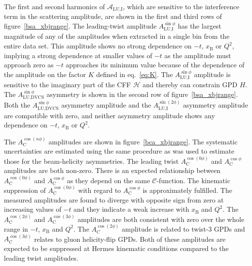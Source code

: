 \documentclass[11pt,a4paper]{article}
\begin{document}
The first and second harmonics of $\mathcal{A}_{\textrm{LU,I}}$, which are sensitive to the interference term in the scattering amplitude, are shown in the first and third rows of figure~\ref{bsa_xbjrange}. The leading-twist amplitude $A_{\textrm{LU,I}}^{\sin\phi}$ has the largest magnitude of any of the amplitudes when extracted in a single bin from the entire data set. This amplitude shows no strong dependence on $-t$, $x_{\textrm{B}}$ or $Q^{2}$, implying a strong dependence at smaller values of $-t$ as the amplitude must approach zero as $-t$ approaches its minimum value because of the dependence of the amplitude on the factor $K$ defined in eq.~\ref{eq:K}. The $A_{\textrm{LU,I}}^{\sin\phi}$ amplitude is sensitive to the imaginary part of the CFF $\mathcal{H}$ and thereby can constrain GPD $\textit{H}$. The $A_{\textrm{LU,DVCS}}^{\sin\phi}$ asymmetry is shown in the second row of figure~\ref{bsa_xbjrange}. Both the $A_{\textrm{LU,DVCS}}^{\sin\phi}$ asymmetry amplitude and the $A_{\textrm{LU,I}}^{\sin(2\phi)}$ asymmetry amplitude are compatible with zero, and neither asymmetry amplitude shows any dependence on $-t$, $x_{\textrm{B}}$ or $Q^{2}$.

The $A_{\textrm{C}}^{\cos(n\phi)}$ amplitudes are shown in figure~\ref{bca_xbjrange}. The systematic uncertainties are estimated using the same procedure as was used to estimate those for the beam-helicity asymmetries. The leading twist $A_{\textrm{C}}^{\cos(0\phi)}$ and $A_{\textrm{C}}^{\cos\phi}$ amplitudes are both non-zero. There is an expected relationship between $A_{\textrm{C}}^{\cos(0\phi)}$ and $A_{\textrm{C}}^{\cos\phi}$ as they depend on the same $\mathcal{C}$-function. The kinematic suppression of $A_{\textrm{C}}^{\cos(0\phi)}$ with regard to $A_{\textrm{C}}^{\cos\phi}$ is approximately fulfilled. The measured amplitudes are found to diverge with opposite sign from zero at increasing values of $-t$ and they indicate a weak increase with $x_{\textrm{B}}$ and $Q^{2}$. The $A_{\textrm{C}}^{\cos(2\phi)}$ and $A_{\textrm{C}}^{\cos(3\phi)}$ amplitudes are both consistent with zero over the whole range in $-t$, $x_{\textrm{B}}$ and $Q^{2}$. The $A_{C}^{\cos(2\phi)}$ amplitude is related to twist-3 GPDs and $A_{\textrm{C}}^{\cos(3\phi)}$ relates to gluon helicity-flip GPDs. Both of these amplitudes are expected to be suppressed at H{\sc ermes} kinematic conditions compared to the leading twist amplitudes. 
\end{document}
